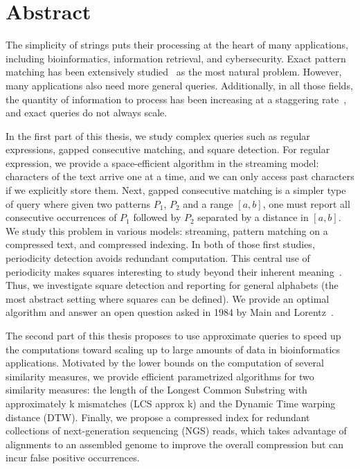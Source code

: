 \chapter*{Abstract}

The simplicity of strings puts their processing at the heart of many applications, including bioinformatics, information retrieval, and cybersecurity. Exact pattern matching has been extensively studied~\cite{charras2004handbook} as the most natural problem. However, many applications also need more general queries. Additionally, in all those fields, the quantity of information to process has been increasing at a staggering rate~\cite{muir2016real}, and exact queries do not always scale.

In the first part of this thesis, we study complex queries such as regular expressions, gapped consecutive matching, and square detection. 
For regular expression, we provide a space-efficient algorithm in the streaming model: characters of the text arrive one at a time, and we can only access past characters if we explicitly store them. 
Next, gapped consecutive matching is a simpler type of query where given two patterns $P_1$, $P_2$ and a range $[a,b]$, one must report all consecutive occurrences of $P_1$ followed by $P_2$ separated by a distance in $[a,b]$. We study this problem in various models: streaming, pattern matching on a compressed text, and compressed indexing.
In both of those first studies, periodicity detection avoids redundant computation. This central use of periodicity makes squares interesting to study beyond their inherent meaning~\cite{Kolpakov2003}. Thus, we investigate square detection and reporting for general alphabets (the most abstract setting where squares can be defined). We provide an optimal algorithm and answer an open question asked in 1984 by Main and Lorentz~\cite{Main1984}.

The second part of this thesis proposes to use approximate queries to speed up the computations toward scaling up to large amounts of data in bioinformatics applications.
Motivated by the lower bounds on the computation of several similarity measures, we provide efficient parametrized algorithms for two similarity measures: the length of the Longest Common Substring with approximately k mismatches (LCS approx k) and the Dynamic Time warping distance (DTW).
Finally, we propose a compressed index for redundant collections of next-generation sequencing (NGS) reads, which takes advantage of alignments to an assembled genome to improve the overall compression but can incur false positive occurrences.

